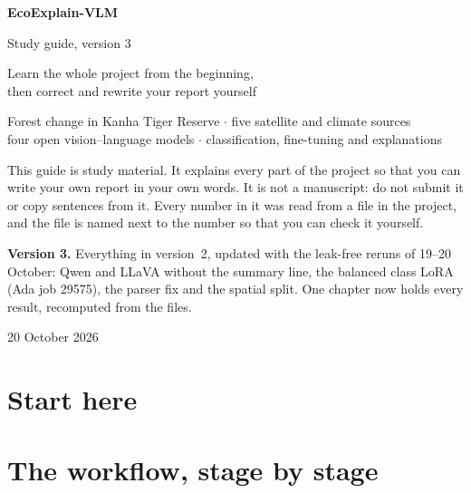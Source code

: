 \documentclass[11pt,a4paper,oneside]{report}
\begin{document}
\begin{titlepage}
\centering
\vspace*{2.2cm}
{\Huge\bfseries EcoExplain-VLM\par}
\vspace{0.5cm}
{\LARGE Study guide, version 3\par}
\vspace{0.3cm}
{\large Learn the whole project from the beginning,\\ then correct and rewrite your report yourself\par}
\vspace{1.4cm}
{\large Forest change in Kanha Tiger Reserve $\cdot$ five satellite and climate sources\\
four open vision--language models $\cdot$ classification, fine-tuning and explanations\par}
\vspace{1.4cm}
\begin{tcolorbox}[colback=watchc!5,colframe=watchc,width=0.86\textwidth]
\small This guide is study material. It explains every part of the project so that you can write your own report in your own words. It is not a manuscript: do not submit it or copy sentences from it. Every number in it was read from a file in the project, and the file is named next to the number so that you can check it yourself.
\end{tcolorbox}
\vspace{0.8cm}
\begin{tcolorbox}[colback=newc!6,colframe=newc,width=0.86\textwidth]
\small \textbf{Version 3.} Everything in version~2, updated with the leak-free reruns of 19--20 October: Qwen and LLaVA without the summary line, the balanced class LoRA (Ada job 29575), the parser fix and the spatial split. One chapter now holds every result, recomputed from the files.
\end{tcolorbox}
\vfill
{\large 20 October 2026\par}
\end{titlepage}

\tableofcontents

\part{Start here}




\part{The workflow, stage by stage}




\end{document}
